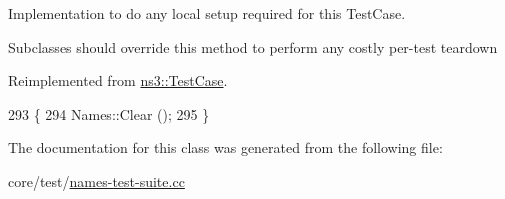 Implementation to do any local setup required for this Test\+Case. 

Subclasses should override this method to perform any costly per-\/test teardown 

Reimplemented from \hyperlink{classns3_1_1TestCase_a8917f1604e28d312a8086f76291e3c46}{ns3\+::\+Test\+Case}.


\begin{DoxyCode}
293 \{
294   Names::Clear ();
295 \}
\end{DoxyCode}


The documentation for this class was generated from the following file\+:\begin{DoxyCompactItemize}
\item 
core/test/\hyperlink{names-test-suite_8cc}{names-\/test-\/suite.\+cc}\end{DoxyCompactItemize}
